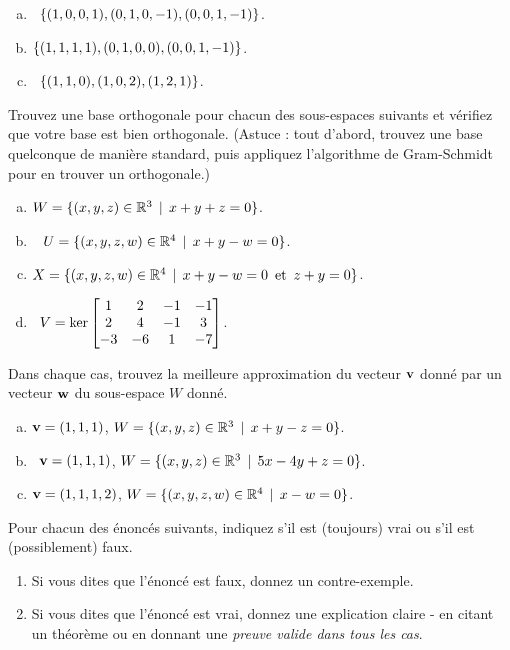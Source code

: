 \begin{prob}
\begin{enumerate}[a)]
\item\sov~$\{(1, 0, 0, 1),(0, 1, 0, -1),(0, 0, 1, -1)\}$.
\medskip
 
\item $\{(1, 1, 1, 1),(0, 1, 0, 0),(0, 0, 1, -1)\}$.
\medskip
 
\item\sov~$\{(1, 1, 0),(1, 0, 2),(1, 2, 1)\}$.
\medskip
 
\end{enumerate}
\end{prob} \begin{prob} \label{prob19.4} Trouvez une base orthogonale pour chacun des sous-espaces suivants et vérifiez que votre base est bien orthogonale. (Astuce : tout d'abord, trouvez une base quelconque de manière standard, puis appliquez l'algorithme de Gram-Schmidt pour en trouver un orthogonale.)
\medskip
\begin{enumerate}[a)]
\item $W=\{(x,y,z)\in\mathbb{R}^3 \, \mid \, x+y+z=0\}$.
\medskip
 
\item\sov~
 $U=\{(x,y,z, w)\in\mathbb{R}^4 \, \mid \, x+y-w=0\}$.\medskip
 
\item $X=\{(x,y,z, w)\in\mathbb{R}^4 \, \mid \, x+y-w=0 \, \text{ et } \, z+y=0\}$.
\medskip
 
\item\sov~$V=\ker \bmatrix 1 & 2 & -1 & -1 \\
 2 & 4 & -1 & 3 \\
 -3 & -6 & 1 & -7 \endbmatrix$.
\medskip
 
\end{enumerate}

\end{prob} \begin{prob} \label{prob19.5} Dans chaque cas, trouvez la meilleure approximation du vecteur $\mathbf{v}$ donné par un vecteur $\mathbf{w}$ du sous-espace $W$ donné. \medskip
\begin{enumerate}[a)]
\item  $\mathbf{v}=(1,1,1)$,  $W=\{(x,y,z)\in\mathbb{R}^3 \, \mid \, x+y-z=0\}$.
\medskip
 
\item\sov~$\mathbf{v}=(1,1,1)$,   $W=\{(x,y,z)\in\mathbb{R}^3 \, \mid \, 5x-4y+z=0\}$.
\medskip
 
\item  $\mathbf{v}=(1,1,1,2)$,   $W=\{(x,y,z, w)\in\mathbb{R}^4 \, \mid \, x-w=0\}$.
\medskip
 
\end{enumerate}
\end{prob} \begin{prob} \label{prob19.6}  Pour chacun des énoncés suivants, indiquez s'il est (toujours) vrai ou s'il est (possiblement) faux.   
   \smallskip    
\begin{enumerate}[$\bullet$]
\item Si vous dites que l'\'enonc\'e est faux, donnez un contre-exemple.   
\item Si vous dites que l'\'enonc\'e est vrai, donnez une explication claire - en citant un théorème ou en donnant une {\it preuve valide dans tous les cas}. 
\end{enumerate}


\end{prob}
